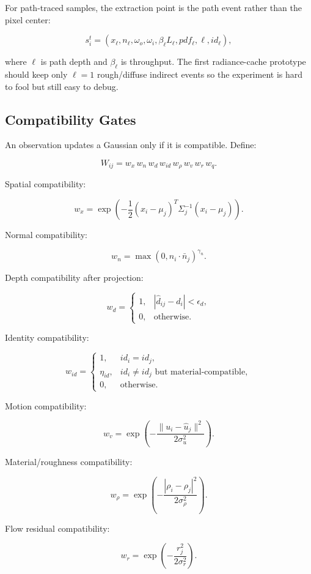 \documentclass[11pt]{article}
\begin{document}
For path-traced samples, the extraction point is the path event rather than the
pixel center:

\[
  s_i^t =
  (x_{\ell}, n_{\ell}, \omega_o, \omega_i, \beta_{\ell}L_{\ell},
   pdf_{\ell}, \ell, id_{\ell}),
\]

where $\ell$ is path depth and $\beta_{\ell}$ is throughput. The first
radiance-cache prototype should keep only $\ell=1$ rough/diffuse indirect
events so the experiment is hard to fool but still easy to debug.

\subsection{Compatibility Gates}

An observation updates a Gaussian only if it is compatible. Define:

\[
  W_{ij} =
  w_x\,w_n\,w_d\,w_{id}\,w_\rho\,w_v\,w_r\,w_q.
\]

Spatial compatibility:

\[
  w_x =
  \exp\left(-\frac{1}{2}(x_i-\mu_j)^T\Sigma_j^{-1}(x_i-\mu_j)\right).
\]

Normal compatibility:

\[
  w_n =
  \max(0, n_i \cdot \bar{n}_j)^{\gamma_n}.
\]

Depth compatibility after projection:

\[
  w_d =
  \begin{cases}
  1, & |\hat{d}_{ij} - d_i| < \epsilon_d,\\
  0, & \text{otherwise}.
  \end{cases}
\]

Identity compatibility:

\[
  w_{id} =
  \begin{cases}
  1, & id_i = id_j,\\
  \eta_{id}, & id_i \neq id_j \text{ but material-compatible},\\
  0, & \text{otherwise}.
  \end{cases}
\]

Motion compatibility:

\[
  w_v =
  \exp\left(-\frac{\|u_i - \hat{u}_j\|^2}{2\sigma_u^2}\right).
\]

Material/roughness compatibility:

\[
  w_\rho =
  \exp\left(-\frac{|\rho_i-\rho_j|^2}{2\sigma_\rho^2}\right).
\]

Flow residual compatibility:

\[
  w_r =
  \exp\left(-\frac{r_j^2}{2\sigma_r^2}\right).
\]
\end{document}
